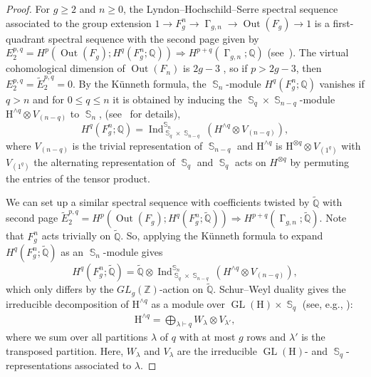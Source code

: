 \documentclass[oneside]{amsart}
\theoremstyle{remark}
\newcommand{\Q}{\mathbb{Q}}
\newcommand{\Z}{\mathbb{Z}}
\newcommand{\tQ}{\widetilde{\Q}}
\newcommand{\PA}{{\operatorname{\Gamma}}}
\DeclareMathOperator{\SG}{{\mathbb S}}
\newcommand{\GL}{{\operatorname{GL}}}
\newcommand{\Out}{{\operatorname{Out}}}
\newcommand{\Ind}{\operatorname{Ind}}
\newcommand{\parts}{\vdash}
\begin{document}
\begin{proof}
For $g \geq 2$ and $n \geq 0$, the Lyndon--Hochschild--Serre spectral sequence associated to the group extension $1 \rightarrow F_g^n \rightarrow \PA_{g,n} \rightarrow \Out(F_g) \rightarrow 1$ 
is a first-quadrant spectral sequence with the second page given by 
$E_2^{p,q} = H^p(\Out(F_g); H^q(F_g^n;\Q)) \Rightarrow H^{p+q}(\PA_{g,n};\Q)$ (see~\cite[Section~3.2]{conant2016assembling}).
The virtual cohomological dimension of $\Out(F_n)$ is $2g-3$ \cite{CV},
so if $p > 2g-3$, then $E_2^{p,q} = \widetilde {E}_2^{p,q} = 0$.
By the Künneth formula, the $\SG_n$-module $H^q(F_g^n;\Q)$ 
vanishes if $q > n$ and for $0\leq q\leq n$ it 
is obtained by inducing the $\SG_{q}\times \SG_{n-q}$-module $\mathrm H^{\wedge q} \otimes V_{(n-q)}$ to $\SG_n$, (see~\cite[Lemma~3.4]{conant2016assembling} for details),
$$H^q(F_g^n;\Q) = 
\Ind^{\SG_n}_{\SG_q\times \SG_{n-q}} \left( H^{\wedge q} \otimes V_{(n-q)}\right),$$
where $V_{(n-q)}$ is the trivial representation of $\SG_{n-q}$ and $\mathrm H^{\wedge q}$ is $\mathrm H^{\otimes q}\otimes V_{(1^q)}$ with $V_{(1^q)}$ the alternating representation of $\SG_q$ and $\SG_q$ acts on $H^{\otimes q}$ by permuting the entries of the tensor product.

We can set up a similar spectral sequence with coefficients twisted by $\tQ$ with second page $\widetilde E_2^{p,q} = H^p(\Out(F_g); H^q(F_g^n;\tQ)) \Rightarrow H^{p+q}(\PA_{g,n};\tQ)$.
Note that $F_g^n$ acts trivially on $\tQ$. So, applying the Künneth formula to expand $H^q(F_g^n;\tQ)$ as an $\SG_n$-module gives 
$$H^q(F_g^n;\tQ) = \tQ \otimes 
\Ind^{\SG_n}_{\SG_q\times \SG_{n-q}} \left( H^{\wedge q} \otimes V_{(n-q)}\right),$$ which only differs by the $GL_g(\Z)$-action on $\tQ$. 
Schur--Weyl duality gives the irreducible decomposition of $\mathrm H^{\wedge q}$ as a module over $\GL(\mathrm H)\times \SG_q$ (see, e.g., \cite[Section~3.1]{conant2016assembling}):
\begin{align*} \mathrm H^{\wedge q} = \bigoplus_{\lambda \parts q} W_\lambda \otimes V_{\lambda'}, \end{align*}
where we sum over all partitions $\lambda$ of $q$ with at most $g$ rows  and $\lambda'$ is the transposed partition. Here,
$W_\lambda$ and $V_\lambda$ are the irreducible $\GL(\mathrm H)$- and $\SG_q$-representations associated to $\lambda$.


\end{proof}
\end{document}
